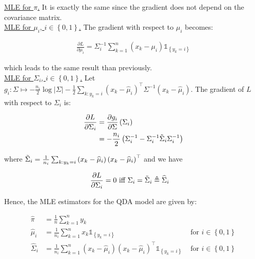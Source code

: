 \documentclass[a4paper, 11pt]{article}
\begin{document}
\underline{MLE for $\pi$.} It is exactly the same since the gradient does not depend on the covariance matrix. \\

\underline{MLE for $\mu_{i}$, $i \in \left\{ 0, 1 \right\}$.} The gradient with respect to $\mu_{i}$ becomes:

\begin{equation*}
    \begin{aligned}
    \frac{\partial L}{\partial \mu_{i}} = \Sigma_{i}^{-1} \sum_{k=1}^{n} \left( x_{k} - \mu_{i} \right) \mathds{1}_{\left\{ y_k = i \right\}}
    \end{aligned}
\end{equation*}

which leads to the same result than previously. \\

\underline{MLE for $\Sigma_{i}$, $i \in \left\{ 0, 1 \right\}$.} Let $g_{i}: \Sigma \mapsto - \frac{n_{i}}{2} \log \left| \Sigma \right| - \frac{1}{2} \sum_{k: y_{k}=i} \left( x_{k} - \widehat{\mu}_{i} \right)^\top \Sigma^{-1} \left( x_{k} - \widehat{\mu}_{i} \right)$. The gradient of $L$ with respect to $\Sigma_{i}$ is:

\begin{equation*}
    \begin{aligned}
    \frac{\partial L}{\partial \Sigma_{i}} &=  \frac{\partial g_{i}}{\partial \Sigma} \left( \Sigma_{i} \right) \\
    &= - \frac{n_{i}}{2} \left( \Sigma_{i}^{-1} - \Sigma_{i}^{-1} \Tilde{\Sigma}_{i} \Sigma_{i}^{-1} \right)
    \end{aligned}
\end{equation*}

where $\Tilde{\Sigma}_{i} = \frac{1}{n_{i}} \sum_{k:y_{k}=i} \left( x_{k} - \widehat{\mu}_{i} \right) \left( x_{k} - \widehat{\mu}_{i} \right)^\top$ and we have

\begin{equation*}
    \begin{aligned}
    \frac{\partial L}{\partial \Sigma_{i}} = 0 &\text{ iff } \Sigma_{i} = \Tilde{\Sigma}_{i} \triangleq \widehat{\Sigma}_{i}
    \end{aligned}
\end{equation*}


Hence, the MLE estimators for the QDA model are given by:

\begin{equation*}
    \boxed{\begin{aligned}
    \widehat{\pi} &= \frac{1}{n} \sum_{k=1}^{n} y_{k} \\
    \widehat{\mu}_{i} &= \frac{1}{n_{i}} \sum_{k=1}^{n} x_{k} \mathds{1}_{\left\{ y_{k} = i \right\}} & \text{ for } i \in \left\{ 0, 1 \right\} \\
    \widehat{\Sigma}_{i} &= \frac{1}{n_{i}} \sum_{k=1}^{n} \left( x_{k} - \widehat{\mu}_{i} \right) \left( x_{k} - \widehat{\mu}_{i} \right)^\top \mathds{1}_{\left\{ y_{k} = i \right\}} & \text{ for } i \in \left\{ 0, 1 \right\}
    \end{aligned}}
\end{equation*}
\end{document}
